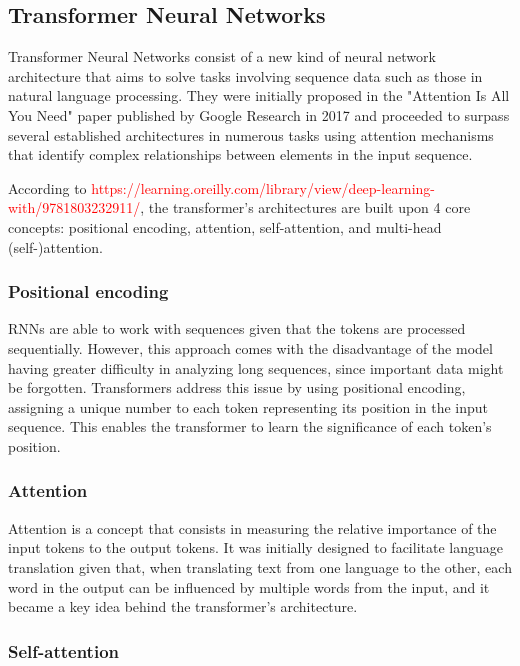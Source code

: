 \subsection{Transformer Neural Networks}
\label{subsection:transformer_neural_networks}

Transformer Neural Networks consist of a new kind of neural network architecture that aims to solve tasks involving sequence data such as those in natural language processing. They were initially proposed in the "Attention Is All You Need" paper published by Google Research in 2017\cite{Vaswani2017} and proceeded to surpass several established architectures in numerous tasks using attention mechanisms that identify complex relationships between elements in the input sequence.

According to \textcolor{red}{https://learning.oreilly.com/library/view/deep-learning-with/9781803232911/}, the transformer's architectures are built upon 4 core concepts: positional encoding, attention, self-attention, and multi-head (self-)attention.

\subsubsection{Positional encoding}

RNNs are able to work with sequences given that the tokens are processed sequentially. However, this approach comes with the disadvantage of the model having greater difficulty in analyzing long sequences, since important data might be forgotten. Transformers address this issue by using positional encoding, assigning a unique number to each token representing its position in the input sequence. This enables the transformer to learn the significance of each token's position.

\subsubsection{Attention}

Attention is a concept that consists in measuring the relative importance of the input tokens to the output tokens. It was initially designed to facilitate language translation given that, when translating text from one language to the other, each word in the output can be influenced by multiple words from the input, and it became a key idea behind the transformer's architecture.

\subsubsection{Self-attention}

